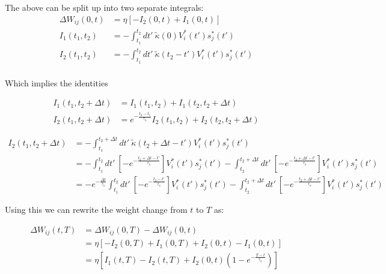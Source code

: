 The above can be split up into two separate integrals:
\begin{align}
  \Delta W_{ij}(0,t) & =\eta \left[ -I_2 (0, t) + I_1(0,t) \right]                                      \\
  I_1(t_1, t_2)      & = - \int_{t_1}^{t_2} dt' \ \tilde{\kappa} (0) V_i^\ast (t') s_j^\ast (t')        \\
  I_2(t_1, t_2)      & = - \int_{t_1}^{t_2} dt' \ \tilde{\kappa} (t_2 - t') V_i^\ast (t') s_j^\ast (t') \\
\end{align}

Which implies the identities

\begin{align}
  I_1(t_1, t_2 + \Delta t) & = I_1 (t_1, t_2) + I_1 (t_2, t_2 + \Delta t)                                       \\
  I_2(t_1, t_2 + \Delta t) & = e^{- \frac{t_2 - t_1}{\tau_{\kappa}}} I_2 (t_1, t_2) + I_2 (t_2, t_2 + \Delta t)
\end{align}


\begin{align}
  I_2 (t_1, t_2 + \Delta t) & = -\int_{t_1}^{t_2 + \Delta t} dt' \ \tilde{\kappa} (t_2 + \Delta t - t') V_i^\ast (t') s_j^\ast (t')                                        \\
                            & = -\int_{t_1}^{t_2} dt' \ \left[ -e^{- \frac{t_2 + \Delta t - t'}{\tau_\kappa}} \right] V_i^\ast (t') s_j^\ast (t')
  -\int_{t_2}^{t_2 + \Delta t} dt' \ \left[ -e^{- \frac{t_2 + \Delta t - t'}{\tau_\kappa}} \right] V_i^\ast (t') s_j^\ast (t')                                             \\
                            & = -e^{- \frac{ \Delta t}{\tau_\kappa}} \int_{t_1}^{t_2} dt' \ \left[ -e^{- \frac{t_2 - t'}{\tau_\kappa}} \right] V_i^\ast (t') s_j^\ast (t')
  -\int_{t_2}^{t_2 + \Delta t} dt' \ \left[ -e^{- \frac{t_2 + \Delta t - t'}{\tau_\kappa}} \right] V_i^\ast (t') s_j^\ast (t')
\end{align}


Using this we can rewrite the weight change from $t$ to $T$ as:


\begin{align}
  \Delta W_{ij}(t,T) & = \Delta W_{ij}(0,T) - \Delta W_{ij}(0,t)                                               \\
                     & = \eta [-I_2(0,T) + I_1(0,T) + I_2(0,t) - I_1(0,t)]                                     \\
                     & = \eta [I_1(t,T) - I_2(t,T) + I_2(0,t)\left( 1 - e^{- \frac{T-t}{\tau_\kappa}} \right)]
\end{align}

